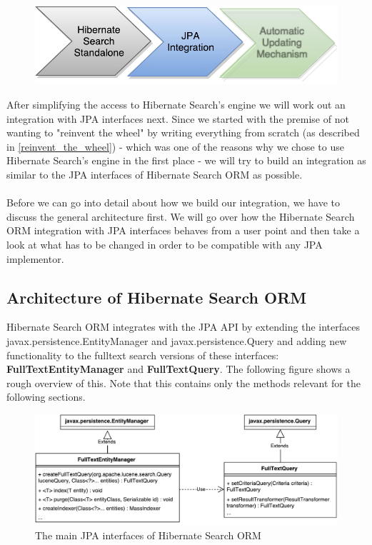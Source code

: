 \begin{figure}[ht]
	\centering
	\includegraphics[scale=0.75]{images/timeline_genericjpa_second.pdf}
	\label{project_timeline_second}
\end{figure}
\noindent
After simplifying the access to Hibernate Search's engine we will work out an integration with JPA interfaces next. Since we started with the premise of not wanting to "reinvent the wheel" by writing everything from scratch (as described in \ref{reinvent_the_wheel}) - which was one of the reasons why we chose to use Hibernate Search's engine in the first place - we will try to build an integration as similar to the JPA interfaces of Hibernate Search ORM as possible.
\\\\
Before we can go into detail about how we build our integration, we have to discuss the general architecture first. We will go over how the Hibernate Search ORM integration with JPA interfaces behaves from a user point and then take a look at what has to be changed in order to be compatible with any JPA implementor.

\pagebreak

\subsection{Architecture of Hibernate Search ORM}

Hibernate Search ORM integrates with the JPA API by extending the interfaces  javax.persistence.EntityManager and javax.persistence.Query and adding new functionality to the fulltext search versions of these interfaces: \textbf{FullTextEntityManager} and \textbf{FullTextQuery}. The following figure shows a rough overview of this. Note that this contains only the methods relevant for the following sections.
\\
\begin{figure}[ht]
	\centering
	\includegraphics[scale=0.6]{images/hibernate_search_jpa_integration_original.pdf}
	\caption{The main JPA interfaces of Hibernate Search ORM}
	\label{hibernate_search_jpa_integration_original}
\end{figure}

